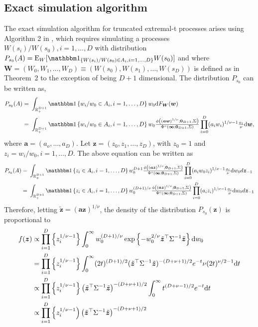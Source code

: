 \documentclass[lineno]{biometrika}
\begin{document}
\subsection{Exact simulation algorithm} 
The exact simulation algorithm for truncated extremal-t processes arises using Algorithm 2 in \cite{Dombry.Engelke.Oesting:2016}, which requires simulating a processes $ W(s_i)/W(s_0), i=1,\dots,D$ with distribution $P_{s_0}(A) = \E_W[\mathbbm 1_{\{W(s_i)/W(s_0)\in A_i, i=1,\dots,D\}}W(s_0)]$ and where $\bm W = (W_0, W_1, \ldots, W_D) \equiv \left( W(s_0), W(s_1), \ldots, W(s_D)\right)$ is defined as in Theorem~2 to the exception of being $D+1$ dimensional. The distribution $P_{s_0}$ can be written as,
\begin{align*}
	P_{s_0}(A) =&\ \int_{\mathbb{R}_+^{D+1}} \mathbbm 1 \left\{w_i/w_0 \in A_i, i=1,\dots,D  \right\} w_0 \text dF_{\bm W}(\bm w)  \\
	=&\ \int_{\mathbb{R}_+^{D+1}} \mathbbm 1 \left\{ w_i/w_0 \in A_i, i=1,\dots,D \right\} w_0 \frac{\phi\left(\left( \bm a \bm w\right)^{1/\nu};\bm 0_{D+1},\Sigma\right)}{\Phi^\circ(\bm \infty; \bm 0_{D+1}, \Sigma)} \prod_{i=0}^D(a_i w_i)^{1/\nu-1} \frac{a_i}{\nu} \text d \bm w,
\end{align*}  	
where $\bm a = (a_o, \ldots, a_D)$.
Let $\bm z = (z_0, z_1, \ldots, z_D)$, with $z_0 = 1$ and $z_i = w_i/w_0, i=1, \ldots, D$. The above equation can be written as
%
\begin{align*}
P_{s_0}(A) =&\ \int_{\mathbb{R}_+^{D+1}} \mathbbm 1 \left\{z_i \in A_i, i=1,\dots,D\right\} w_0^{D+1} 
\frac{\phi\left(\left( \bm a \bm z\right)^{1/\nu};\bm 0_{D+1},\Sigma\right)}{\Phi^\circ(\bm \infty; \bm 0_{D+1}, \Sigma)} \prod_{i=0}^D(a_i w_0 z_i)^{1/\nu-1} \frac{a_i}{\nu} \text dw_0 d \bm z_{-1}\\
=&\ \int_{\mathbb{R}_+^{D+1}} \mathbbm 1 \left\{ z_i \in A_i, i=1,\dots,D\right\} w_0^{(D+1)/\nu} \frac{\phi\left(\left( \bm a \bm z\right)^{1/\nu};\bm 0_{D+1},\Sigma\right)}{\Phi^\circ(\bm \infty; \bm 0_{D+1}, \Sigma)} \prod_{i=0}^D(a_i z_i)^{1/\nu-1} \frac{a_i}{\nu} \text dw_0 d \bm z_{-1}\\
\end{align*}
%
Therefore, letting $\tilde{\bm z} = ( \bm a \bm z)^{1/\nu}$, the density of the distribution $P_{s_0}(\bm z)$ is proportional to 
\begin{align*}
f(\bm z) & \propto \prod_{i=1}^D \left\{ z_i^{1/\nu-1}\right\}
 \int_{0}^{\infty} w_0^{(D+1)/\nu} \exp\left\{- w_0^{2/\nu} \tilde{\bm z}^\top \Sigma^{-1} \tilde{\bm z} \right\} \text dw_0 \\
	&= \prod_{i=1}^D \left\{ z_i^{1/\nu-1} \right\}
 \int_{0}^{\infty} (2t)^{(D+1)/2} (\tilde{\bm z}^\top \Sigma^{-1} \tilde{\bm z})^{-(D+\nu+1)/2} e^{-t} \nu (2t)^{\nu/2-1} \text dt \\
	& \propto  \prod_{i=1}^D \left\{ z_i^{1/\nu-1}\right\}  \left(\tilde{\bm z}^\top \Sigma^{-1} \tilde{\bm z}\right)^{-(D+\nu+1)/2} \int_{0}^{\infty} t^{(D+\nu-1)/2} e^{-t} \text dt \\
	&\propto \prod_{i=1}^D \left\{z_i^{1/\nu-1}\right) \left(\tilde{\bm z}^\top \Sigma^{-1}\tilde{\bm z}\right)^{-(D+\nu+1)/2}
\end{align*}
\end{document}
